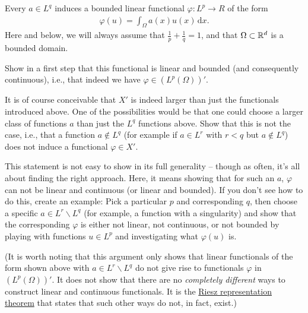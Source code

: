 \documentclass[12pt]{memoir}
\begin{document}
\begin{Ej}
    Every $a\in L^q$ induces a
bounded linear functional $\varphi:L^p\rightarrow R$ of the form
\begin{align*}
  \varphi(u) = \int_\Omega a(x) u(x) \, \text{d}x.
\end{align*}
Here and below, we will always assume that $\frac 1p + \frac 1q = 1$,
and that $\Omega\subset\mathbb{R}^d$ is a bounded domain.

Show in a first step that this functional is linear and bounded (and
consequently continuous), i.e., that indeed we have $\varphi\in (L^p(\Omega))'$.

It is of course conceivable that $X'$ is indeed larger than just the
functionals introduced above. One of the possibilities would be that
one could choose a larger class of functions $a$ than just the $L^q$
functions above. Show that this is not the case, i.e., that a function
$a\not\in L^q$ (for example if $a\in L^r$ with $r<q$ but $a\not\in
L^q$) does not induce a functional $\varphi\in X'$.

This statement is not easy to show in its full generality -- though as
often, it's all about finding the right approach. Here, it means
showing that for such an $a$, $\varphi$ can not be linear and
continuous (or linear and bounded). If you
don't see how to do this, create an example: Pick a particular $p$ and
corresponding $q$, then choose a specific $a\in L^r\backslash L^q$
(for example, a function with a singularity) and show that the
corresponding $\varphi$ is either not linear, not continuous, or not
bounded by playing with functions $u\in L^p$ and investigating what
$\varphi(u)$ is.

(It is worth noting that this argument only shows that linear
functionals of the form shown above with $a \in L^r\backslash L^q$ do
not give rise to functionals $\varphi$ in $(L^p(\Omega))'$. It does
not show that there are no \textit{completely different} ways to
construct linear and continuous functionals. It is the
\href{https://en.wikipedia.org/wiki/Riesz_representation_theorem}{Riesz
representation
theorem}
that states that such other ways do not, in fact, exist.)
\end{Ej}
\end{document}
